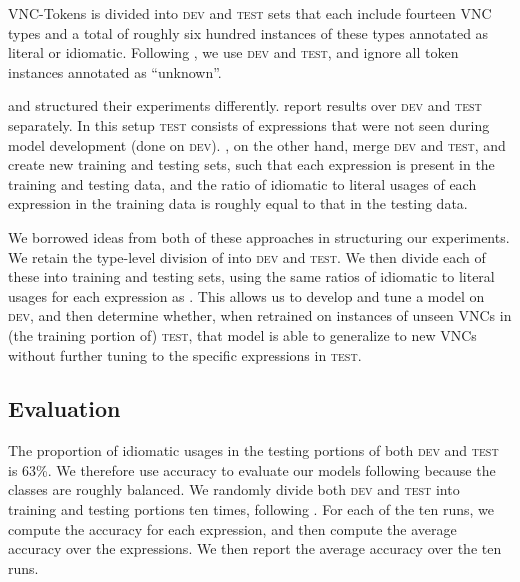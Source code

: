 \documentclass[11pt,a4paper]{article}
\newcommand{\dev}{\textsc{dev}\xspace}
\newcommand{\test}{\textsc{test}\xspace}
\begin{document}
VNC-Tokens is divided into \dev and \test sets that each include
fourteen VNC types and a total of roughly six hundred instances of
these types annotated as literal or idiomatic. Following
, we use \dev and \test, and ignore all
token instances annotated as ``unknown''.







 and  structured
their experiments differently. \citeauthor{Fazly2009} report results
over \dev and \test separately. In this setup
\test consists of expressions that were not seen during model
development (done on \dev). \citeauthor{salton-ross-kelleher},
on the other hand, merge \dev and \test, and create
new training and testing sets, such that each expression is present in
the training and testing data, and the ratio of idiomatic to literal
usages of each expression in the training data is roughly equal to
that in the testing data.



We borrowed ideas from both of these approaches in structuring our
experiments. We retain the type-level division of 
 into \dev and \test. We then divide each of
these into training and testing sets, using the same ratios of
idiomatic to literal usages for each expression as
.
This allows us to develop and tune a model on \dev, and then determine
whether, when retrained on instances of unseen VNCs in (the training
portion of) \test, that model is able to generalize to new VNCs
without further tuning to the specific expressions in \test.








\subsection{Evaluation}\label{eval}

The proportion of idiomatic usages in the testing portions of both
\dev and \test is 63\%. We therefore use accuracy to evaluate our
models following  because the classes are roughly
balanced.  
We randomly divide both \dev and \test into training and testing
portions ten times, following . For each
of the ten runs, we compute the accuracy for each expression, and then
compute the average accuracy over the expressions. We then report
the average accuracy over the ten runs.
\end{document}
